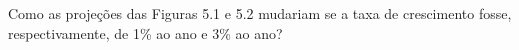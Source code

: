 Como as projeções das Figuras 5.1 e 5.2 mudariam se a taxa de crescimento fosse, respectivamente, de 1\% ao ano e 3\% ao ano?
